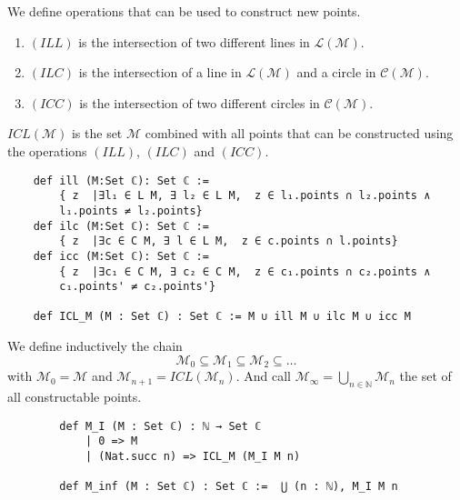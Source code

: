 \begin{frame}[fragile]
    \begin{definition}
        \label{def:rules_to_constructed_a_point}
        We define operations that can be used to construct new points.
        \begin{enumerate}
            \item $(ILL)$ is the intersection of two different lines in $\mathcal{L(M)}$.
            \item $(ILC)$ is the intersection of a line in $\mathcal{L(M)}$ and a circle in $\mathcal{C(M)}$.
            \item $(ICC)$ is the intersection of two different circles in $\mathcal{C(M)}$.
        \end{enumerate}
        $ICL(\mathcal{M})$ is the set $\mathcal{M}$ combined with all points that can be constructed using the operations $(ILL)$, $(ILC)$ and $(ICC)$.
    \end{definition}
    
    \begin{lstlisting}
    def ill (M:Set ℂ): Set ℂ := 
        { z  |∃l₁ ∈ L M, ∃ l₂ ∈ L M,  z ∈ l₁.points ∩ l₂.points ∧ 
        l₁.points ≠ l₂.points}
    def ilc (M:Set ℂ): Set ℂ := 
        { z  |∃c ∈ C M, ∃ l ∈ L M,  z ∈ c.points ∩ l.points}
    def icc (M:Set ℂ): Set ℂ := 
        { z  |∃c₁ ∈ C M, ∃ c₂ ∈ C M,  z ∈ c₁.points ∩ c₂.points ∧ 
        c₁.points' ≠ c₂.points'}    
    
    def ICL_M (M : Set ℂ) : Set ℂ := M ∪ ill M ∪ ilc M ∪ icc M
    \end{lstlisting}
\end{frame}


\begin{frame}[fragile]
    \begin{definition}
        \label{def:set_of_constructable_points}
        We define inductively the chain
        \begin{equation*}
            \mathcal{M}_0 \subseteq \mathcal{M}_1 \subseteq \mathcal{M}_2 \subseteq \dots
        \end{equation*}
        with $\mathcal{M}_0 = \mathcal{M}$ and $\mathcal{M}_{n+1} = ICL(\mathcal{M}_n)$.\newline
        And call $\mathcal{M}_{\infty} = \bigcup_{n \in \mathbb{N}} \mathcal{M}_n$ the set of all constructable points.
    \end{definition}
    
    \begin{lstlisting}
        def M_I (M : Set ℂ) : ℕ → Set ℂ
            | 0 => M
            | (Nat.succ n) => ICL_M (M_I M n)
    
        def M_inf (M : Set ℂ) : Set ℂ :=  ⋃ (n : ℕ), M_I M n
    \end{lstlisting}    
\end{frame}